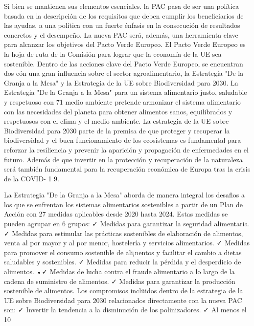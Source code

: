\documentclass[10pt,a4paper]{article}
\begin{document}
Si bien se mantienen sus elementos esenciales. la PAC pasa de ser una política basada en la descripción de los requisitos que deben cumplir los beneficiarios de las ayudas, a una política con un fuerte énfasis en la consecución de resultados concretos y el desempeño. La nueva PAC será, además, una herramienta clave para alcanzar los objetivos del Pacto Verde Europeo. El Pacto Verde Europeo es la hoja de ruta de la Comisión para lograr que la economía de la UE sea sostenible. Dentro de las acciones clave del Pacto Verde Europeo, se encuentran dos eón una gran influencia sobre el sector agroalimentario, la Estrategia "De la Granja a la Mesa" y la Estrategia de la UE sobre Biodiversidad para 2030. La Estrategia "De la Granja a la Mesa" para un sistema alimentario justo, saludable y respetuoso con 71 medio ambiente pretende armonizar el sistema alimentario con las necesidades del planeta para obtener alimentos sanos, equilibrados y respetuosos con el clima y el medio ambiente. La estrategia de la UE sobre Biodiversidad para 2030 parte de la premisa de que proteger y recuperar la biodiversidad y el buen funcionamiento de los ecosistemas es fundamental para reforzar la resiliencia y prevenir la aparición y propagación de enfermedades en el futuro. Además de que invertir en la protección y recuperación de la naturaleza será también fundamental para la recuperación económica de Europa tras la crisis de la COVID- 1 9. 

La Estrategia "De la Granja a la Mesa" aborda de manera integral los desafios a los que se enfrentan los sistemas alimentarios sostenibles a partir de un Plan de Acción con 27 medidas aplicables desde 2020 hasta 2024. Estas medidas se pueden agrupar en 6 grupos: ✓ Medidas para garantizar la seguridad alimentaria. ✓ Medidas para estimular las prácticas sostenibles de elaboración de alimentos, venta al por mayor y al por menor, hostelería y servicios alimentarios. ✓ Medidas para promover el consumo sostenible de ali¡nentos y facilitar el cambio a dietas saludables y sostenibles. ✓ Medidas para reducir la pérdida y el desperdicio de alimentos. •✓ Medidas de lucha contra el fraude alimentario a lo largo de la cadena de suministro de alimentos. ✓ Medidas para garantizar la producción sostenible de alimentos. Los compromisos inclüidos dentro de la estrategia de la UE sobre Biodiversidad para 2030 relacionados directamente con la nueva PAC son: ✓ Invertir la tendencia a la disminución de los polinizadores. ✓ Al menos el 10%
\end{document}
